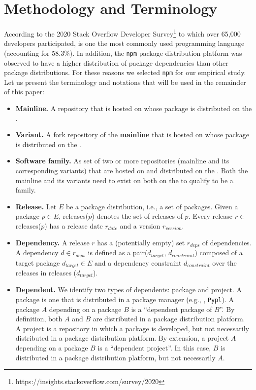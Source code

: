 \section{Methodology and Terminology}
\label{sec:method}
According to the 2020 Stack Overflow Developer Survey\footnote{https://insights.stackoverflow.com/survey/2020} to which over 65,000 developers participated, \js is one the most commonly used programming language (accounting for 58.3\%). In addition, the \texttt{npm} package distribution platform was observed to have a higher distribution of package dependencies than other package distributions\cite{Decan:2019:emse}.  
For these reasons we selected \texttt{npm} for our empirical study.
Let us present the terminology and notations that will be used in the remainder of this paper:

\begin{itemize}
    \item \textbf{Mainline.} A repository that is hosted on \scp whose package is distributed on the \npm.
    
    \item \textbf{Variant.} A fork repository of the \textbf{mainline} that is hosted on \scp whose package is distributed on the \npm.
    
    \item \textbf{Software family.} As set of two or more repositories (mainline and its corresponding variants) that are hosted on \scp and distributed on the \npm. Both the mainline and its variants need to exist on both on the \npm to qualify to be a family.
    
    \item \textbf{Release.} Let $E$ be a package distribution, i.e., a set of packages. Given a package $p\in E$, releases($p$) denotes the set of releases of $p$. Every release $r\in$ releases($p$) has a release date $r_{date}$ and a version $r_{version}$.
    
     \item \textbf{Dependency.} A release $r$ has a (potentially empty) set $r_{deps}$ of dependencies. A dependency $d \in r_{deps}$ is defined as a pair($d_{target}$, $d_{constraint}$) composed of a target package $d_{target} \in E$ and a dependency constraint $d_{constraint}$ over the releases in releases ($d_{target}$).
    
    \item \textbf{Dependent.} We identify two types of dependents: package and project. A package is one that is distributed in a package manager (e.g., \np, \texttt{Pypl}). A package $A$ depending on a package $B$ is a ``dependent package of $B$''. By definition, both $A$ and $B$ are distributed in a package distribution platform. A project is a repository in which a package is developed, but not necessarily distributed in a package distribution platform. By extension, a project $A$ depending on a package $B$ is a ``dependent project''. In this case, $B$ is distributed in a package distribution platform, but not necessarily $A$.
    
\end{itemize}

